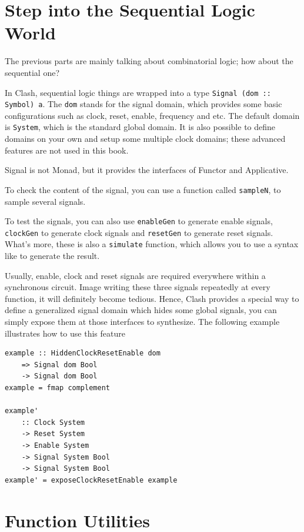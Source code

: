 \documentclass[a4paper,12pt, oneside]{book}
\begin{document}
\section{Step into the Sequential Logic World} 
The previous parts are mainly talking about combinatorial logic; how about the sequential one? 

In Clash, sequential logic things are wrapped into a type \texttt{Signal (dom :: Symbol) a}.
The \texttt{dom} stands for the signal domain, which provides some basic configurations such as
clock, reset, enable, frequency and etc. The default domain is \texttt{System}, which is the standard global domain. It is also possible to define domains on your own and setup some multiple clock domains; these advanced features are not used in this book.

Signal is not Monad, but it provides the interfaces of Functor and Applicative.

To check the content of the signal, you can use a function called \texttt{sampleN}, to sample several signals.

To test the signals, you can also use \texttt{enableGen} to generate enable signals, 
\texttt{clockGen} to generate clock signals and \texttt{resetGen} to generate reset signals. What's more, these is also a \texttt{simulate} function, which allows you to use a syntax like  to generate the result.

Usually, enable, clock and reset signals are required everywhere within a synchronous circuit. Image writing these three signals repeatedly at every function, it will definitely become tedious. Hence, Clash provides a special way to define a generalized signal domain which hides some global signals, you can simply expose them at those interfaces to synthesize.
The following example illustrates how to use this feature
\begin{verbatim}
example :: HiddenClockResetEnable dom
    => Signal dom Bool
    -> Signal dom Bool
example = fmap complement

example' 
    :: Clock System
    -> Reset System
    -> Enable System
    -> Signal System Bool
    -> Signal System Bool
example' = exposeClockResetEnable example 
\end{verbatim} 

\section{Function Utilities}
\end{document}
